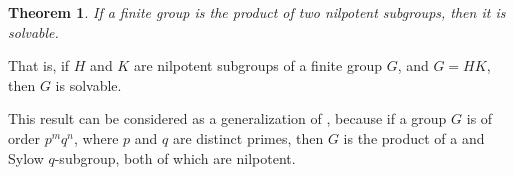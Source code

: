 \documentclass[12pt]{article}
\newtheorem*{thm*}{Theorem}
\begin{document}

\begin{thm*}
If a finite group is the product of two nilpotent subgroups,
then it is solvable.
\end{thm*}

That is, if $H$ and $K$ are nilpotent subgroups of a finite group $G$,
and $G=HK$, then $G$ is solvable.

This result can be considered as
a generalization of ,
because if a group $G$ is of order $p^m q^n$, where $p$ and $q$ are distinct primes, then $G$ is the product of a  and Sylow $q$-subgroup, both of which are nilpotent.
\end{document}
